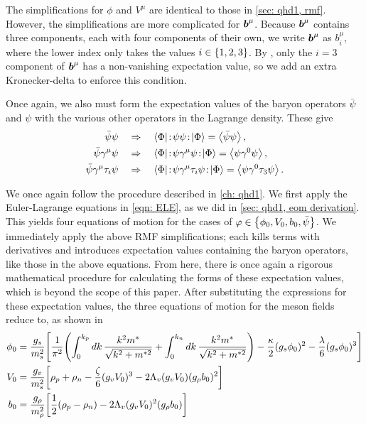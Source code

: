 The simplifications for $\phi$ and $V^\mu$ are identical to those in \autoref{sec: qhd1, rmf}. However, the simplifications are more complicated for ${\boldsymbol b}^\mu$. Because ${\boldsymbol b}^\mu$ contains three components, each with four components of their own, we write ${\boldsymbol b}^\mu$ as $b_i^\mu$, where the lower index only takes the values $i \in \Bqty{1,2,3}$. By \autocite[p. 74]{diener_2008}, only the $i=3$ component of ${\boldsymbol b}^\mu$ has a non-vanishing expectation value, so we add an extra Kronecker-delta to enforce this condition. 

Once again, we also must form the expectation values of the baryon operators $\bar\psi$ and $\psi$ with the various other operators in the Lagrange density. These give
\begin{align}
    \bar\psi\psi &\goesto \bra{\Phi}\!:\!\psi\psi\!:\!\ket{\Phi} = \expval{\bar\psi\psi},\\
    \bar\psi\gamma^\mu \psi &\goesto \bra{\Phi}\!:\!\psi\gamma^\mu\psi\!:\!\ket{\Phi} = \expval{\psi\gamma^0\psi},\\
    \bar\psi\gamma^\mu\tau_i\psi &\goesto \bra{\Phi}\!:\!\psi\gamma^\mu\tau_i\psi\!:\!\ket{\Phi} = \expval{\psi\gamma^0\tau_3\psi}.
\end{align}

We once again follow the procedure described in \autoref{ch: qhd1}. We first apply the Euler-Lagrange equations in \eqref{eqn: ELE}, as we did in \autoref{sec: qhd1, eom derivation}. This yields four equations of motion for the cases of $\varphi \in \Bqty{\phi_0,V_0,b_0,\bar\psi}$. We immediately apply the above RMF simplifications; each kills terms with derivatives and introduces expectation values containing the baryon operators, like those in the above equations. From here, there is once again a rigorous mathematical procedure for calculating the forms of these expectation values, which is beyond the scope of this paper. After substituting the expressions for these expectation values, the three equations of motion for the meson fields reduce to, as shown in \autocite[p. 79]{diener_2008}
\begin{align}
    \phi_0 & = \frac{g_s}{m_s^2}\bqty{\frac{1}{\pi^2} \pqty{\int_0^{k_p} \dd{k} \frac{k^2 m^*}{\sqrt{k^2 + m^{*2}}} + \int_0^{k_n} \dd{k} \frac{k^2 m^*}{\sqrt{k^2 + m^{*2}}}} -\frac{\kappa}{2}(g_s\phi_0)^2 -\frac{\lambda}{6}(g_s\phi_0)^3 }\label{eqn: adv, phi0}\\
    V_0 & = \frac{g_v}{m_s^2} \bqty{\rho_p + \rho_n - \frac{\zeta}{6}(g_v V_0)^3 - 2 \Lambda_v (g_vV_0)(g_\rho b_0)^2}\label{eqn: adv, V0}\\
    b_0 & = \frac{g_\rho}{m_\rho^2} \bqty{\frac{1}{2}(\rho_p - \rho_n) - 2\Lambda_v(g_vV_0)^2(g_\rho b_0)}\label{eqn: adv, b0}
\end{align}

